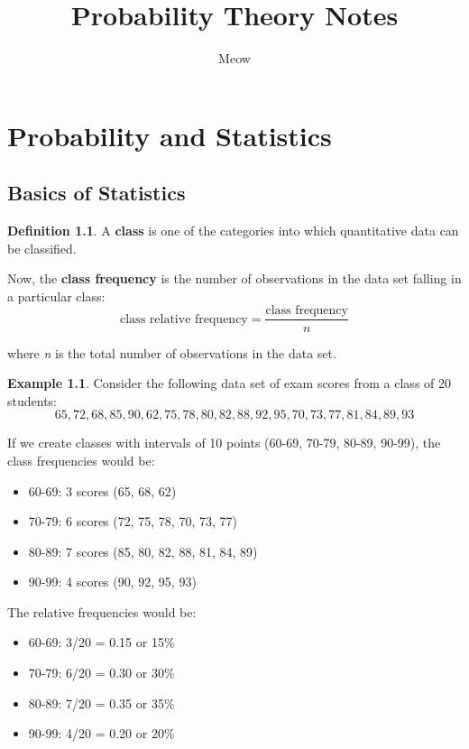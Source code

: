 \documentclass[12pt]{book}
\title{Probability Theory Notes}
\author{Meow}
\theoremstyle{definition}
\newtheorem{exmp}{Example}[section]
\newtheorem{definition}{Definition}[section]
\begin{document}
\maketitle
\chapter{Probability and Statistics}
\setcounter{section}{2}

\section{Basics of Statistics}
\begin{definition}
    A \textbf{class} is one of the categories into which quantitative data can be classified.
\end{definition}

Now, the \textbf{class frequency} is the number of observations in the data set falling in a particular class:
\begin{equation}
    \text{class relative frequency} = \frac{\text{class frequency}}{n}
\end{equation}

where \textit{n} is the total number of observations in the data set.

\begin{exmp}
    Consider the following data set of exam scores from a class of 20 students:
    \[ 65, 72, 68, 85, 90, 62, 75, 78, 80, 82, 88, 92, 95, 70, 73, 77, 81, 84, 89, 93 \]
    
    If we create classes with intervals of 10 points (60-69, 70-79, 80-89, 90-99), the class frequencies would be:
    \begin{itemize}
        \item 60-69: 3 scores (65, 68, 62)
        \item 70-79: 6 scores (72, 75, 78, 70, 73, 77)
        \item 80-89: 7 scores (85, 80, 82, 88, 81, 84, 89)
        \item 90-99: 4 scores (90, 92, 95, 93)
    \end{itemize}
    
    The relative frequencies would be:
    \begin{itemize}
        \item 60-69: 3/20 = 0.15 or 15\%
        \item 70-79: 6/20 = 0.30 or 30\%
        \item 80-89: 7/20 = 0.35 or 35\%
        \item 90-99: 4/20 = 0.20 or 20\%
    \end{itemize}
\end{exmp}
\end{document}
